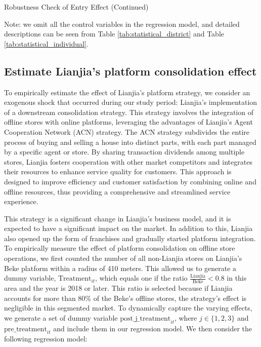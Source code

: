 \documentclass[11pt]{article}
\begin{document}
\begin{table}
  \begin{center}
    \begin{scriptsize}
      \caption{Robustness Check of Entry Effect (Continued)}
      \label{tab:entry_effect_robustness_2}
      
    
    Note: we omit all the control variables in the regression model, and detailed descriptions can be seen from Table \ref{tab:statistical_district} and Table \ref{tab:statistical_individual}.
    \end{scriptsize}
  \end{center}
\end{table}

\subsection{Estimate Lianjia's platform consolidation effect} \label{subsec:acn_strategy}

To empirically estimate the effect of Lianjia's platform strategy, we consider an exogenous shock that occurred during our study period: Lianjia's implementation of a downstream consolidation strategy. This strategy involves the integration of offline stores with online platforms, leveraging the advantages of Lianjia's Agent Cooperation Network (ACN) strategy. The ACN strategy subdivides the entire process of buying and selling a house into distinct parts, with each part managed by a specific agent or store. By sharing transaction dividends among multiple stores, Lianjia fosters cooperation with other market competitors and integrates their resources to enhance service quality for customers. This approach is designed to improve efficiency and customer satisfaction by combining online and offline resources, thus providing a comprehensive and streamlined service experience. 

This strategy is a significant change in Lianjia's business model, and it is expected to have a significant impact on the market. In addition to this, Lianjia also opened up the form of franchises and gradually started platform integration. To empirically measure the effect of platform consolidation on offline store operations, we first counted the number of all non-Lianjia stores on Lianjia's Beke platform within a radius of 410 meters. This allowed us to generate a dummy variable, $\text{Treatment}_{it}$, which equals one if the ratio $\frac{\text{Lianjia}}{\text{Beke}} < 0.8$ in this area and the year is 2018 or later. This ratio is selected because if Lianjia accounts for more than 80\% of the Beke's offline stores, the strategy's effect is negligible in this segmented market. To dynamically capture the varying effects, we generate a set of dummy variable $\text{post\_j\_treatment}_{it}$, where $j \in \{1, 2, 3\}$ and $\text{pre\_treatment}_{it}$ and include them in our regression model. We then consider the following regression model:
\end{document}
